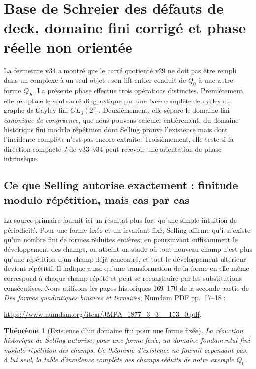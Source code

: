 \documentclass[11pt,a4paper]{article}
\newtheorem{theorem}{Théorème}[section]
\begin{document}
\section{Base de Schreier des d\'efauts de deck, domaine fini corrig\'e et phase r\'eelle non orient\'ee}\label{sec:v35-deck-fundamental-phase}

La fermeture v34 a montr\'e que le carr\'e quotient\'e v29 ne doit pas \^etre rempli dans un
complexe \`a un seul objet : son lift entier conduit de $Q_0$ \`a une autre forme $Q_K$.
La pr\'esente phase effectue trois op\'erations distinctes. Premi\`erement, elle remplace le
seul carr\'e diagnostique par une base compl\`ete de cycles du graphe de Cayley fini
$GL_3(2)$. Deuxi\`emement, elle s\'epare le domaine fini \emph{canonique de congruence},
que nous pouvons calculer enti\`erement, du domaine historique fini modulo r\'ep\'etition
dont Selling prouve l'existence mais dont l'incidence compl\`ete n'est pas encore extraite.
Troisi\`emement, elle teste si la direction compacte $J$ de v33--v34 peut recevoir une
orientation de phase intrins\`eque.

\subsection{Ce que Selling autorise exactement : finitude modulo r\'ep\'etition, mais cas par cas}

La source primaire fournit ici un r\'esultat plus fort qu'une simple intuition de p\'eriodicit\'e.
Pour une forme fix\'ee et un invariant fix\'e, Selling affirme qu'il n'existe qu'un nombre fini
de formes r\'eduites enti\`eres; en poursuivant suffisamment le d\'eveloppement des champs,
on atteint un stade o\`u tout nouveau champ n'est plus qu'une r\'ep\'etition d'un champ d\'ej\`a
rencontr\'e, et tout le d\'eveloppement ult\'erieur devient r\'ep\'etitif. Il indique aussi qu'une
transformation de la forme en elle-m\^eme correspond \`a chaque champ r\'ep\'et\'e et peut se
reconstruire par les substitutions cons\'ecutives. Nous utilisons les pages historiques
169--170 de la seconde partie de \emph{Des formes quadratiques binaires et ternaires},
Numdam PDF pp.~17--18 :
\begin{center}\small
\url{https://www.numdam.org/item/JMPA_1877_3_3__153_0.pdf}.
\end{center}

\begin{theorem}[Existence d'un domaine fini pour une forme fix\'ee]\label{thm:v35-selling-finite-existence}
La r\'eduction historique de Selling autorise, pour une forme fix\'ee, un domaine fondamental
fini \emph{modulo r\'ep\'etition des champs}. Ce th\'eor\`eme d'existence ne fournit cependant
pas, \`a lui seul, la table d'incidence compl\`ete des champs r\'eduits de notre exemple $Q_0$.
\end{theorem}
\end{document}
